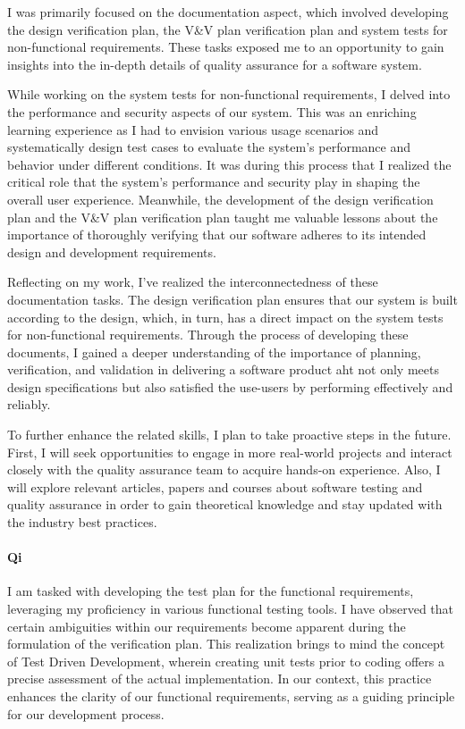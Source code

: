 \documentclass[12pt, titlepage]{article}
\begin{document}
I was primarily focused on the documentation aspect, which involved developing
the design verification plan, the V\&V plan verification plan and system tests
for non-functional requirements. These tasks exposed me to an opportunity to
gain insights into the in-depth details of quality assurance for a software
system.

While working on the system tests for non-functional requirements, I delved into
the performance and security aspects of our system. This was an enriching
learning experience as I had to envision various usage scenarios and
systematically design test cases to evaluate the system’s performance and
behavior under different conditions. It was during this process that I realized
the critical role that the system’s performance and security play in shaping the
overall user experience. Meanwhile, the development of the design verification
plan and the V\&V plan verification plan taught me valuable lessons about the
importance of thoroughly verifying that our software adheres to its intended
design and development requirements.

Reflecting on my work, I’ve realized the interconnectedness of these
documentation tasks. The design verification plan ensures that our system is
built according to the design, which, in turn, has a direct impact on the system
tests for non-functional requirements. Through the process of developing these
documents, I gained a deeper understanding of the importance of planning,
verification, and validation in delivering a software product aht not only meets
design specifications but also satisfied the use-users by performing effectively
and reliably.

To further enhance the related skills, I plan to take proactive steps in the
future. First, I will seek opportunities to engage in more real-world projects
and interact closely with the quality assurance team to acquire hands-on
experience. Also, I will explore relevant articles, papers and courses about
software testing and quality assurance in order to gain theoretical knowledge
and stay updated with the industry best practices.

\paragraph*{Qi}

I am tasked with developing the test plan for the functional requirements,
leveraging my proficiency in various functional testing tools. I have observed
that certain ambiguities within our requirements become apparent during the
formulation of the verification plan. This realization brings to mind the
concept of Test Driven Development, wherein creating unit tests prior to coding
offers a precise assessment of the actual implementation. In our context, this
practice enhances the clarity of our functional requirements, serving as a
guiding principle for our development process.
\end{document}
